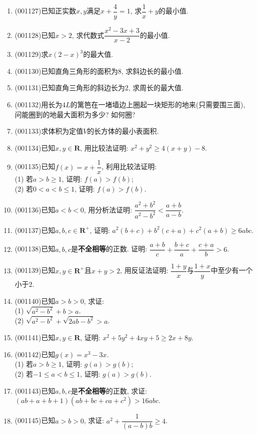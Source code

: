 \documentclass[10pt,a4paper]{article}
\begin{document}
\begin{enumerate}[1.]
\item {\tiny (001127)}已知正实数$x,y$满足$x+\dfrac{4}{y}=1$, 求$\dfrac{1}{x}+y$的最小值.
\item {\tiny (001128)}已知$x>2$, 求代数式$\dfrac{x^2-3x+3}{x-2}$的最小值.
\item {\tiny (001129)}求$x(2-x)^3$的最大值.
\item {\tiny (001130)}已知直角三角形的面积为$8$, 求斜边长的最小值.
\item {\tiny (001131)}已知直角三角形的斜边长为$2$, 求周长的最大值.
\item {\tiny (001132)}用长为$4L$的篱笆在一堵墙边上圈起一块矩形的地来(只需要围三面), 问能圈到的地最大面积为多少? 如何圈?
\item {\tiny (001133)}求体积为定值$V$的长方体的最小表面积.
\item {\tiny (001134)}已知$x,y \in \mathbf{R}$, 用比较法证明: $x^2+y^2\ge 4(x+y)-8$.
\item {\tiny (001135)}已知$f(x)=x+\dfrac{1}{x}$, 利用比较法证明:\\ 
(1) 若$a>b\ge 1$, 证明: $f(a)>f(b)$;\\ 
(2) 若$0<a<b\le 1$, 证明: $f(a)>f(b)$.
\item {\tiny (001136)}已知$a<b<0$, 用分析法证明: $\dfrac{a^2+b^2}{a^2-b^2}<\dfrac{a+b}{a-b}$.
\item {\tiny (001137)}已知$a,b,c\in \mathbf{R}^+$, 证明: $a^2(b+c)+b^2(c+a)+c^2(a+b)\ge 6abc$.
\item {\tiny (001138)}已知$a,b,c$是{\bf 不全相等}的正数. 证明: $\dfrac{a+b}{c}+\dfrac{b+c}{a}+\dfrac{c+a}{b}>6$.
\item {\tiny (001139)}已知$x,y\in \mathbf{R}^+$且$x+y>2$, 用反证法证明: $\dfrac{1+y}{x}$与$\dfrac{1+x}{y}$中至少有一个小于$2$.
\item {\tiny (001140)}已知$a>b>0$, 求证: \\ 
(1) $\sqrt{a^2-b^2}+b>a$.\\ 
(2) $\sqrt{a^2-b^2}+\sqrt{2ab-b^2}>a$.
\item {\tiny (001141)}已知$x,y\in \mathbf{R}$, 证明: $x^2+5y^2+4xy+5\ge 2x+8y$.
\item {\tiny (001142)}已知$g(x)=x^3-3x$.\\ 
(1) 若$a>b\ge 1$, 证明: $g(a)>g(b)$;\\ 
(2) 若$-1\le a<b\le 1$, 证明: $g(a)>g(b)$.
\item {\tiny (001143)}已知$a,b,c$是{\bf 不全相等}的正数, 求证: $(ab+a+b+1)(ab+bc+ca+c^2)> 16abc$.
\item {\tiny (001145)}已知$a>b>0$, 求证: $a^2+\dfrac{1}{(a-b)b}\ge 4$.

\end{enumerate}
\end{document}
